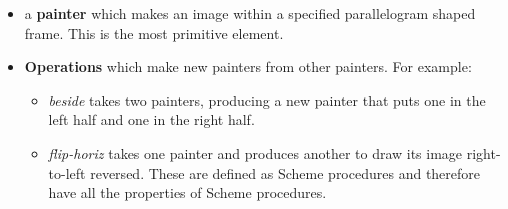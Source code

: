 \documentclass[final,fleqn,titlepage]{article}
\begin{document}
\begin{itemize}
\item a \textbf{painter} which makes an image within a specified parallelogram shaped
frame. This is the most primitive element.
\item \textbf{Operations} which make new painters from other painters. For example:
\begin{itemize}
\item \emph{beside} takes two painters, producing a new painter that puts one in the
left half and one in the right half.
\item \emph{flip-horiz} takes one painter and produces another to draw its image
right-to-left reversed. These are defined as Scheme procedures and therefore
have all the properties of Scheme procedures.
\end{itemize}
\end{itemize}
\end{document}
